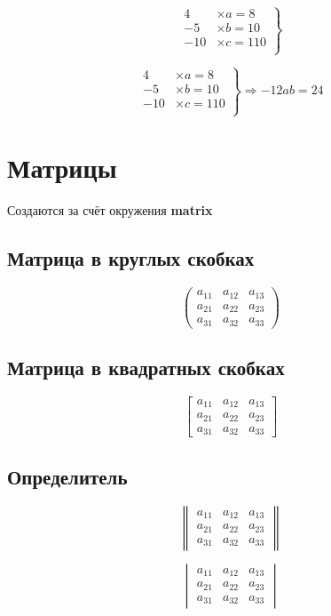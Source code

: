 \documentclass[a4paper,12pt]{article} %
\begin{document}
$$ \left.
\begin{aligned}
4&\times a=8 \\
-5&\times b=10 \\
-10&\times c=110 \\
\end{aligned} \right \} $$

$$ \left.
\begin{aligned}
4&\times a=8 \\
-5&\times b=10 \\
-10&\times c=110 \\
\end{aligned} \right \} \Rightarrow -12ab=24 $$

\section{Матрицы}
Создаются за счёт окружения \textbf{matrix}

\subsection{Матрица в круглых скобках}
$$ \begin{pmatrix}
a_{11}& a_{12}& a_{13} \\
a_{21}& a_{22}& a_{23} \\
a_{31}& a_{32}& a_{33}
\end{pmatrix} $$

\subsection{Матрица в квадратных скобках}
$$ \begin{bmatrix}
a_{11}& a_{12}& a_{13} \\
a_{21}& a_{22}& a_{23} \\
a_{31}& a_{32}& a_{33}
\end{bmatrix} $$

\subsection{Определитель}

$$ \begin{Vmatrix}
a_{11}& a_{12}& a_{13} \\
a_{21}& a_{22}& a_{23} \\
a_{31}& a_{32}& a_{33}
\end{Vmatrix} $$

$$ \begin{vmatrix}
a_{11}& a_{12}& a_{13} \\
a_{21}& a_{22}& a_{23} \\
a_{31}& a_{32}& a_{33}
\end{vmatrix} $$
\end{document}
